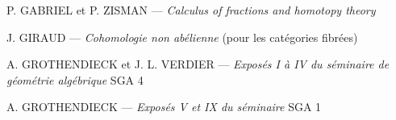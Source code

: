 





\renewcommand{\bibname}{REFERENCES}
\def\refname{R\MakeLowercase{EFERENCES}}
\begin{thebibliography}{99}

  {\sc P. GABRIEL et P. ZISMAN} ---
  {\it Calculus of fractions and homotopy theory}
  
  {\sc J. GIRAUD} ---
  {\it Cohomologie non abélienne}
  (pour les catégories fibrées)
  
  {\sc A. GROTHENDIECK et J. L. VERDIER} ---
  {\it Exposés I à IV du séminaire de géométrie algébrique}
  SGA 4
  
  {\sc A. GROTHENDIECK} ---
  {\it Exposés V et IX du séminaire}
  SGA 1



\end{thebibliography}







